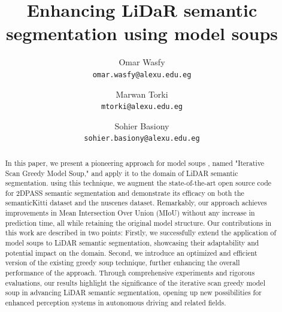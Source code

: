 \documentclass[10pt,twocolumn,letterpaper]{article}
\begin{document}
	\title{Enhancing LiDaR semantic segmentation using model soups }
	\author{ Omar Wasfy\\
	{\tt\small omar.wasfy@alexu.edu.eg}
\and
Marwan Torki\\
{\tt\small mtorki@alexu.edu.eg}
\and
Sohier Basiony\\
{\tt\small sohier.basiony@alexu.edu.eg}
}
\maketitle
\begin{abstract}
	In this paper, we present a pioneering approach for model soups \cite{wortsman2022model,dansereau2023model}, named "Iterative Scan Greedy Model Soup," and apply it to the domain of LiDAR semantic segmentation. using this technique, we augment the state-of-the-art open source code for 2DPASS \cite{yan20222dpass} semantic segmentation and demonstrate its efficacy on both the semanticKitti dataset and the nuscenes dataset. Remarkably, our approach achieves improvements in Mean Intersection Over Union (MIoU) without any increase in prediction time, all while retaining the original model structure.	Our contributions in this work are described in two points: Firstly, we successfully extend the application of model soups to LiDAR semantic segmentation, showcasing their adaptability and potential impact on the domain. Second, we introduce an optimized and efficient version of the existing greedy soup technique, further enhancing the overall performance of the approach. Through comprehensive experiments and rigorous evaluations, our results highlight the significance of the iterative scan greedy model soup in advancing LiDAR semantic segmentation, opening up new possibilities for enhanced perception systems in autonomous driving and related fields.
\end{abstract}
\end{document}
